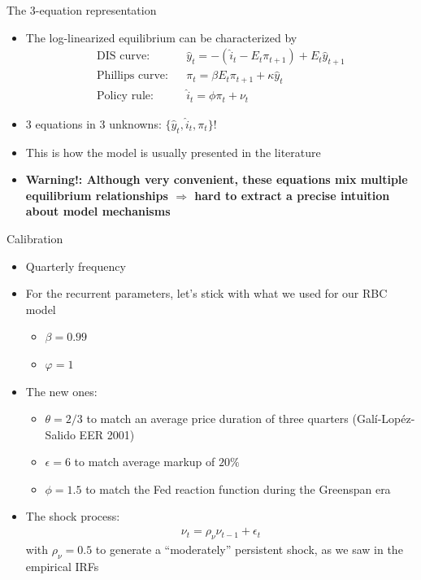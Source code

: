 \documentclass[9pt,xcolor={dvipsnames}]{beamer}
\newcommand{\bit}{\begin{itemize}}
\newcommand{\eit}{\end{itemize}}
\begin{document}
\begin{frame}{The 3-equation representation}

\bit
\setlength\itemsep{1.5em}
\item The log-linearized equilibrium can be characterized by
\begin{eqnarray}
\text{DIS curve:} && \hat y_t = - (\hat i_t-E_t \pi_{t+1}) + E_t \hat y_{t+1} \nonumber \\
\text{Phillips curve:} && \pi_t = \beta E_t \pi_{t+1} + \kappa \hat y_t \nonumber \\
\text{Policy rule:} && \hat i_t = \phi \pi_t + \nu_t \nonumber 
\end{eqnarray}

\item 3 equations in 3 unknowns: $\{\hat y_t, \hat i_{t}, \pi_t\}$!	

\item This is how the model is usually presented in the literature

\item \bf Warning!: \normalfont Although very convenient, these equations mix multiple equilibrium relationships $\Rightarrow$ hard to extract a precise intuition about model mechanisms
\eit

\end{frame}




\begin{frame}{Calibration}

\bit
\setlength\itemsep{1.5em}
\item Quarterly frequency

\item For the recurrent parameters, let's stick with what we used for our RBC model
\bit
\setlength\itemsep{0.5em}
\item $\beta = 0.99$

\item $\varphi = 1$
\eit

\item The new ones:
\bit
\setlength\itemsep{0.5em}

\item $\theta=2/3$ to match an average price duration of three quarters (Gal\'{i}-Lop\'{e}z-Salido EER 2001)

\item $\epsilon=6$ to match average markup of $20 \%$

\item $\phi = 1.5$ to match the Fed reaction function during the Greenspan era
\eit

\item The shock process:
\begin{eqnarray}
\nu_t = \rho_{\nu} \nu_{t-1} + \epsilon_t \nonumber
\end{eqnarray}
with $\rho_{\nu} = 0.5$ to generate a ``moderately'' persistent shock, as we saw in the empirical IRFs

\eit

\end{frame}
\end{document}
